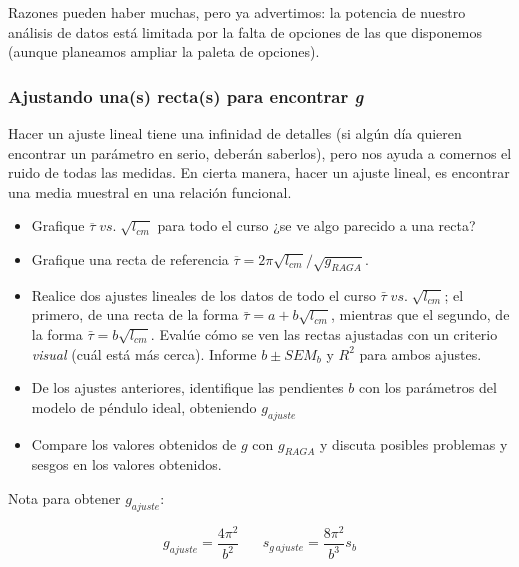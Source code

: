 \documentclass[10pt,a4paper]{article}
\numberwithin{equation}{section}%
\numberwithin{equation}{subsection}
\begin{document}
Razones pueden haber muchas, pero ya advertimos: la potencia de nuestro análisis de datos está limitada por la falta de opciones de las que disponemos (aunque planeamos ampliar la paleta de opciones). 



\subsubsection*{Ajustando una(s) recta(s) para encontrar \textit{g}}

Hacer un ajuste lineal tiene una infinidad de detalles (si algún día quieren encontrar un parámetro en serio, deberán saberlos), pero nos ayuda a comernos el ruido de todas las medidas. En cierta manera, hacer un ajuste lineal, es encontrar una media muestral en una relación funcional.



\begin{itemize}
\item[\textbf{a)}] Grafique $\overline{\tau} \; vs. \; \sqrt{l_{cm}}$ para todo el curso ¿se ve algo parecido a una recta?
\item[\textbf{b)}] Grafique una recta de referencia $\overline{\tau} = 2 \pi \sqrt{l_{cm}} /\sqrt{g_{RAGA}}$.   
\item[\textbf{c)}] Realice dos ajustes lineales de los datos de todo el curso $\bar{\tau} \; vs. \; \sqrt{l_{cm}}$; el primero, de una recta de la forma $\bar{\tau} = a + b \sqrt{l_{cm}}$, mientras que el segundo, de la forma $\bar{\tau} = b \sqrt{l_{cm}}$. Evalúe cómo se ven las rectas ajustadas con un criterio \textit{visual} (cuál está más cerca). Informe $b \pm SEM_b$ y $R^2$ para ambos ajustes.
\item[g)] De los ajustes anteriores, identifique las pendientes $b$ con los parámetros del modelo de péndulo ideal, obteniendo $g_{ajuste}$
\item[h)] Compare los valores obtenidos de $g$ con $g_{RAGA}$ y discuta posibles problemas y sesgos en los valores obtenidos.
\end{itemize}

\begin{small}
Nota para obtener $g_{ajuste}$:
\end{small}

$$
g_{ajuste} = \frac{4 \pi^2}{b^2} \;\;\;\;\;\; s_{g\,ajuste} = \frac{8\pi^2}{b^3} s_b 
$$
\end{document}
